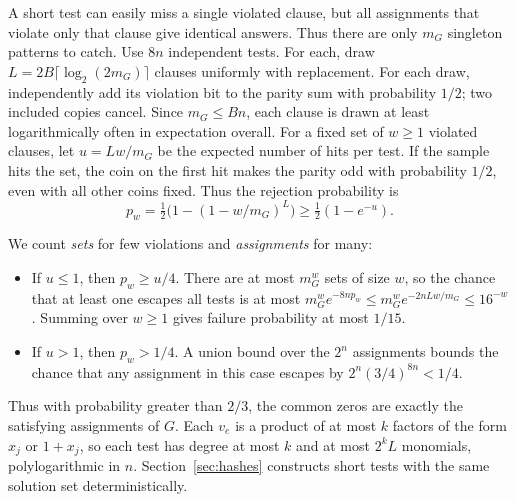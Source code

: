 A short test can easily miss a single violated clause, but all
assignments that violate only that clause give identical answers.
Thus there are only $m_G$ singleton patterns to catch. Use $8n$
independent tests. For each, draw $L=2B\lceil\log_2(2m_G)\rceil$
clauses uniformly with replacement. For each draw, independently add
its violation bit to the parity sum with probability $1/2$; two
included copies cancel. Since $m_G\le Bn$, each clause is drawn
at least logarithmically often in expectation overall. For a fixed
set of $w\ge1$ violated clauses, let $u=Lw/m_G$ be the expected number
of hits per test. If the sample hits the set, the coin on the first
hit makes the parity odd with probability $1/2$, even with all other
coins fixed. Thus the rejection probability is
\[
 p_w=\tfrac12\bigl(1-(1-w/m_G)^L\bigr)\ge\tfrac12(1-e^{-u}).
\]

We count \emph{sets} for few violations and \emph{assignments} for many:
\begin{itemize}
\item If $u\le1$, then $p_w\ge u/4$. There are at most $m_G^w$ sets
of size $w$, so the chance that at least one escapes all tests is
at most $m_G^w e^{-8np_w}\le m_G^w e^{-2nLw/m_G}\le16^{-w}$.
Summing over $w\ge1$ gives failure probability at most $1/15$.
\item If $u>1$, then $p_w>1/4$. A union bound over the $2^n$
assignments bounds the chance that any assignment in this case
escapes by $2^n(3/4)^{8n}<1/4$.
\end{itemize}
Thus with probability greater than $2/3$, the common zeros are
exactly the satisfying assignments of $G$. Each $v_e$ is a product
of at most $k$ factors of the form $x_j$ or $1+x_j$, so each test has degree at
most $k$ and at most $2^kL$ monomials, polylogarithmic in $n$.
Section~\ref{sec:hashes} constructs short tests with the same
solution set deterministically.

